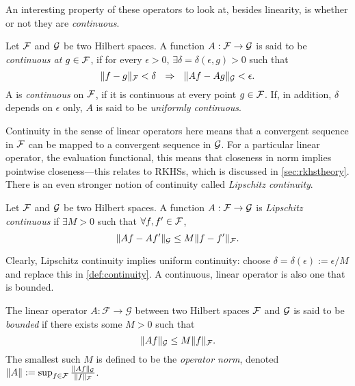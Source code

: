 \vspace{-0.6em}
An interesting property of these operators to look at, besides linearity, is whether or not they are \emph{continuous}.

\begin{definition}[Continuity]\label{def:continuity}
  Let ${\mathcal F}$ and ${\mathcal G}$ be two Hilbert spaces.
  A function $A:{\mathcal F}\to{\mathcal G}$ is said to be \emph{continuous at $g\in{\mathcal F}$}, if for every $\epsilon>0$, $\exists \delta=\delta(\epsilon,g)>0$ such that
  \[
    \norm{f-g}_\cF < \delta \ \ \Rightarrow \ \ \norm{Af - Ag}_\cG < \epsilon.
  \]
  A is \emph{continuous} on ${\mathcal F}$, if it is continuous at every point $g \in{\mathcal F}$.
  If, in addition, $\delta$ depends on $\epsilon$ only, $A$ is said to be \emph{uniformly continuous}.
\end{definition}

Continuity in the sense of linear operators here means that a convergent sequence in ${\mathcal F}$ can be mapped to a convergent sequence in ${\mathcal G}$.
For a particular linear operator, the evaluation functional, this means that closeness in norm implies pointwise closeness---this relates to RKHSs, which is discussed in \cref{sec:rkhstheory}.
There is an even stronger notion of continuity called  \emph{Lipschitz continuity}.

\begin{definition}
  Let ${\mathcal F}$ and ${\mathcal G}$ be two Hilbert spaces.  
  A function $A:{\mathcal F}\to{\mathcal G}$ is \emph{Lipschitz continuous} if $\exists M >0$ such that $\forall f,f'\in{\mathcal F}$,
  \[
    \lVert Af - Af'\rVert_{\mathcal G} \leq M \lVert f - f'\rVert_{\mathcal F}.
  \]
\end{definition}

\vspace{-0.75em}
Clearly, Lipschitz continuity implies uniform continuity: choose $\delta = \delta(\epsilon) := \epsilon/M$ and replace this in  \cref{def:continuity}.
A continuous, linear operator is also one that is bounded.

\begin{definition}\label{def:boundedop}
  The linear operator $A:\mathcal F \rightarrow \mathcal G$ between two Hilbert spaces ${\mathcal F}$ and ${\mathcal G}$ is said to be \emph{bounded} if there exists some $M>0$ such that
  \[
    \norm{Af}_\cG \leq M \norm{f}_\cF.\vspace{-0.4em}
  \]
  The smallest such $M$ is defined to be the \emph{operator norm}, denoted $\lVert A\rVert := \sup_{f\in{\mathcal F}} \frac{\lVert Af\rVert_{\mathcal G}}{\lVert f\rVert_{\mathcal F}}$.
\end{definition}

